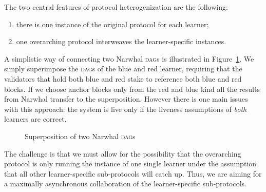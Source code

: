 \documentclass[%
dvipsnames
]{article}
\theoremstyle{definition}
\newcommand{\Dag}[1][]{\textsc{dag}#1\xspace}
\renewcommand{\todo}[2][]{}
\newcounter{old\v,\r}\setcounter{old\v,\r}{0}%
\begin{document}
The two central features of protocol heterogenization are the following:
\begin{enumerate}
\item there is one instance of the original protocol for each learner;
\item one overarching protocol interweaves the learner-specific instances.
\end{enumerate}
A simplistic way of connecting two Narwhal \Dag[s] is illustrated
in Figure~\ref{fig:superposition-dag}. %
We simply superimpose the \Dag[s] of the blue and red learner, %
requiring that the validators that hold both blue and red stake to %
reference both blue and red blocks. %
If we choose anchor blocks only from the red and blue kind %
all the results from Narwhal transfer to the superposition. %
However there is one main issues with this approach: %
the system is live only if the liveness assumptions of \emph{both} learners
are correct. %
\begin{figure}[htb]
  \centering
  
  \caption{Superposition of two Narwhal \Dag[s]}
  \label{fig:superposition-dag}
\end{figure}
\todo[caption={},inline]{%
  To be discussed with isaac: %
  we can use heterogeneous Paxos to keep growing a Narwhal \Dag for each learner.
}

The challenge is that we must allow for the possibility that %
the overarching protocol is only running the instance of one single learner %
under the assumption that %
all other learner-specific sub-protocols will catch up. %
Thus, %
we are aiming for a maximally asynchronous collaboration of the learner-specific
sub-protocols. 
% 



\todo[inline,size=normalsize,caption={}]{probably move the below “hidden material” (see \TeX-source)
  to an earlier point (context)}
\end{document}
